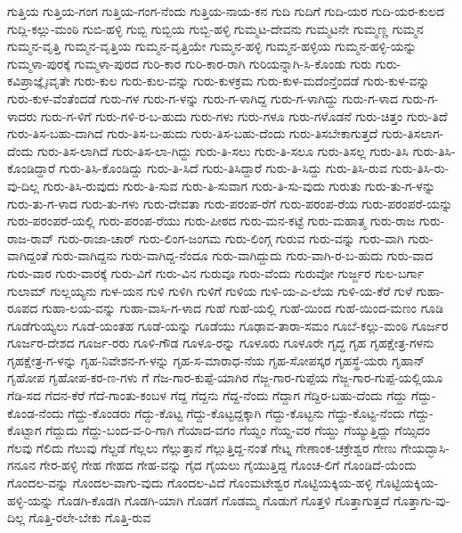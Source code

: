 ಗುತ್ತಿಯ
ಗುತ್ತಿಯ-ಗಂಗ
ಗುತ್ತಿಯ-ಗಂಗ-ನೆಂದು
ಗುತ್ತಿಯ-ನಾಯ-ಕನ
ಗುದಿ
ಗುದಿಗೆ
ಗುದಿ-ಯರ
ಗುದಿ-ಯರ-ಕುಲದ
ಗುದ್ಲಿ-ಕಲ್ಲು-ಮಂಠಿ
ಗುಬಿ-ಹಳ್ಳಿ
ಗುಬ್ಬಿ
ಗುಬ್ಬಿಯ
ಗುಬ್ಬಿ-ಹಳ್ಳಿ
ಗುಮ್ಮಟ-ದೇವನು
ಗುಮ್ಮಟನೇ
ಗುಮ್ಮಣ್ಣ
ಗುಮ್ಮನ
ಗುಮ್ಮನ-ವೃತ್ತಿ
ಗುಮ್ಮನ-ವೃತ್ತಿಯ
ಗುಮ್ಮನ-ವೃತ್ತಿಯೇ
ಗುಮ್ಮನ-ಹಳ್ಳಿ
ಗುಮ್ಮನ-ಹಳ್ಳಿಯ
ಗುಮ್ಮನ-ಹಳ್ಳಿ-ಯನ್ನು
ಗುಮ್ಮಳಾ-ಪುರಕ್ಕೆ
ಗುಮ್ಮಳಾ-ಪುರದ
ಗುರಿ-ಕಾರ
ಗುರಿ-ಕಾರ-ರಾಗಿ
ಗುರಿಯನ್ನಾಗಿ-ಸಿ-ಕೊಂಡು
ಗುರು
ಗುರು-ಕವಿಪ್ರಾಜ್ಞೈಃವೃತೇ
ಗುರು-ಕುಲ
ಗುರು-ಕುಲ-ವನ್ನು
ಗುರು-ಕುಳಕ್ರಮ
ಗುರು-ಕುಳ-ಮದೆಂನ್ತೆಂದಡೆ
ಗುರು-ಕುಳ-ವನ್ನು
ಗುರು-ಕುಳ-ವೆಂತೆಂದಡೆ
ಗುರು-ಗಳ
ಗುರು-ಗ-ಳನ್ನು
ಗುರು-ಗ-ಳಾಗಿದ್ದ
ಗುರು-ಗ-ಳಾಗಿದ್ದು
ಗುರು-ಗ-ಳಾದ
ಗುರು-ಗ-ಳಾದರು
ಗುರು-ಗ-ಳಿಗೆ
ಗುರು-ಗಳಿ-ರ-ಬ-ಹುದು
ಗುರು-ಗಳು
ಗುರು-ಗಳೂ
ಗುರು-ಗಳೊಡನೆ
ಗುರು-ಚಿತ್ತಂ
ಗುರು-ತಿದೆ
ಗುರು-ತಿಸ-ಬಹು-ದಾಗಿದೆ
ಗುರು-ತಿಸ-ಬ-ಹುದು
ಗುರು-ತಿಸ-ಬಹು-ದೆಂದು
ಗುರು-ತಿಸಬೇಕಾಗುತ್ತದೆ
ಗುರು-ತಿಸಲಾಗ-ದೆಂದು
ಗುರು-ತಿಸ-ಲಾಗಿದೆ
ಗುರು-ತಿಸ-ಲಾ-ಗಿದ್ದು
ಗುರು-ತಿ-ಸಲು
ಗುರು-ತಿ-ಸಲೂ
ಗುರು-ತಿಸಲ್ಲ
ಗುರು-ತಿಸಿ
ಗುರು-ತಿಸಿ-ಕೊಂಡಿದ್ದಾರೆ
ಗುರು-ತಿಸಿ-ಕೊಂಡಿದ್ದು
ಗುರು-ತಿ-ಸಿದೆ
ಗುರು-ತಿಸಿದ್ದಾರೆ
ಗುರು-ತಿ-ಸಿದ್ದು
ಗುರು-ತಿಸಿ-ರುವ
ಗುರು-ತಿಸಿ-ರು-ವು-ದಿಲ್ಲ
ಗುರು-ತಿಸಿ-ರುವುದು
ಗುರು-ತಿ-ಸುವ
ಗುರು-ತಿ-ಸುವಾಗ
ಗುರು-ತಿ-ಸು-ವುದು
ಗುರುತು
ಗುರು-ತು-ಗ-ಳನ್ನು
ಗುರು-ತು-ಗ-ಳಾದ
ಗುರು-ತು-ಗಳು
ಗುರು-ದೇವತಾ
ಗುರು-ಪರಂಪ-ರೆಗೆ
ಗುರು-ಪರಂಪ-ರೆಯ
ಗುರು-ಪರಂಪರೆ-ಯನ್ನು
ಗುರು-ಪರಂಪರೆ-ಯಲ್ಲಿ
ಗುರು-ಪರಂಪ-ರೆಯು
ಗುರು-ಪೀಠದ
ಗುರು-ಮನ-ಕಟ್ಟೆ
ಗುರು-ಮಹಾತ್ಮ
ಗುರು-ರಾಜ
ಗುರು-ರಾಜ-ರಾವ್
ಗುರು-ರಾಜಾ-ಚಾರ್
ಗುರು-ಲಿಂಗ-ಜಂಗಮ
ಗುರು-ಲಿಂಗ್ಗ
ಗುರುವ
ಗುರು-ವನ್ನು
ಗುರು-ವಾಗಿ
ಗುರು-ವಾಗಿದ್ದಂತೆ
ಗುರು-ವಾಗಿದ್ದನು
ಗುರು-ವಾಗಿದ್ದ-ನೆಂದೂ
ಗುರು-ವಾಗಿದ್ದುದು
ಗುರು-ವಾಗಿ-ರ-ಬ-ಹುದು
ಗುರು-ವಾದ
ಗುರು-ವಾರ
ಗುರು-ವಾರಕ್ಕೆ
ಗುರು-ವಿಗೆ
ಗುರು-ವಿನ
ಗುರುವೂ
ಗುರು-ವೆಂದು
ಗುರುವೋ
ಗುರ್ಜ್ಜರ
ಗುಲ-ಬರ್ಗಾ
ಗುಲಾಮ್
ಗುಲ್ಲಯ್ಯನು
ಗುಳ-ಯನ
ಗುಳಿ
ಗುಳಿಗಿ
ಗುಳಿಗೆ
ಗುಳಿಯ
ಗುಳಿ-ಯ-ಎ-ಲೆಯ
ಗುಳಿ-ಯ-ಕೆರೆ
ಗುಳೆ
ಗುಹಾ-ರೂಪದ
ಗುಹಾ-ಲಯ-ವನ್ನು
ಗುಹಾ-ವಾಸಿ-ಗ-ಳಾದ
ಗುಹೆ
ಗುಹೆ-ಯಲ್ಲಿ
ಗುಹೆ-ಯಿಂದ
ಗುಹೆ-ಯಿಂದ-ಮಣಂ
ಗೂಡಿ
ಗೂಡೆಗುಯ್ಯಲು
ಗೂಡೆ-ಯಂತಹ
ಗೂಡೆ-ಯನ್ನು
ಗೂಡೆಯು
ಗೂಢಾವ-ತಾರಾ-ಸಮಂ
ಗೂಬೆ-ಕಲ್ಲು-ಮಂಠಿ
ಗೂರ್ಜರ
ಗೂರ್ಜರ-ದೇಶದ
ಗೂರ್ಜ-ರರು
ಗೂಳಿ-ಗೌಡ
ಗೂಳೂ-ರನ್ನು
ಗೂಳೂರು
ಗೂಳೂರೇ
ಗೃದ್ಧ
ಗೃಹ
ಗೃಹಕ್ಷೇತ್ರ-ಗಳನು
ಗೃಹಕ್ಷೇತ್ರ-ಗ-ಳನ್ನು
ಗೃಹ-ನಿವೇಶನ-ಗ-ಳನ್ನು
ಗೃಹ-ಸ-ಮಾರಾಧ-ನೆಯ
ಗೃಹ-ಸೋಪಸ್ಕರ
ಗೃಹಸ್ಥೆ-ಯರು
ಗೃಹಾನ್
ಗೃಹೋಪ
ಗೃಹೋಪ-ಕರ-ಣ-ಗಳು
ಗೆ
ಗೆಜ-ಗಾರ-ಕುಪ್ಪೆ-ಯಾಗಿರ
ಗೆಜ್ಜ-ಗಾರ-ಗುಪ್ಪೆಯ
ಗೆಜ್ಜ-ಗಾರ-ಗುಪ್ಪೆ-ಯಲ್ಲಿಯೂ
ಗೆಡಿ-ಸದ
ಗೆದನ-ಕೆರೆ
ಗೆದೆ-ಗಾಂತು-ಕಂಬಳ
ಗೆದ್ದ
ಗೆದ್ದನು
ಗೆದ್ದ-ನೆಂದು
ಗೆದ್ದಾಗ
ಗೆದ್ದಿರ-ಬಹು-ದೆಂದು
ಗೆದ್ದು
ಗೆದ್ದು-ಕೊಂಡ-ನೆಂದು
ಗೆದ್ದು-ಕೊಂಡರು
ಗೆದ್ದು-ಕೊಟ್ಟ
ಗೆದ್ದು-ಕೊಟ್ಟದ್ದಕ್ಕಾಗಿ
ಗೆದ್ದು-ಕೊಟ್ಟನು
ಗೆದ್ದು-ಕೊಟ್ಟ-ನೆಂದು
ಗೆದ್ದು-ಕೊಟ್ಟಾಗ
ಗೆದ್ದುದು
ಗೆದ್ದು-ಬಂದ-ವ-ರಿ-ಗಾಗಿ
ಗೆಯಾದ-ವಗಂ
ಗೆಯ್ದಂ
ಗೆಯ್ದ-ವರ
ಗೆಯ್ದು
ಗೆಯ್ಯುತ್ತಿದ್ದು
ಗೆಯ್ಸಿದಂ
ಗೆಲವು
ಗೆಲಿದು
ಗೆಲುವು
ಗೆಲ್ದಡೆ
ಗೆಲ್ಲಲು
ಗೆಲ್ಲುತ್ತಾನೆ
ಗೆಲ್ಲುತ್ತಿದ್ದ-ನಂತೆ
ಗೇಟ್ನ
ಗೇಣಾಂಕ-ಚಕ್ರೇಶ್ವರ
ಗೇಣು
ಗೇಯದ್ಭಾಸಿ-ಗನೂನ
ಗೇರ-ಹಳ್ಳಿ
ಗೇಹ
ಗೇಹದ
ಗೇಹ-ವನ್ನು
ಗೈದ
ಗೈಯಲು
ಗೈಯುತ್ತಿದ್ದ
ಗೊಂಚ-ಲಿಗೆ
ಗೊಂಡಿದೆ-ಯೆಂದು
ಗೊಂದಲ-ವನ್ನು
ಗೊಂದಲ-ವಾಗು-ವುದು
ಗೊಂದಲ-ವಿದೆ
ಗೊಂಮಟೇಶ್ವರ
ಗೊಟ್ಟಿಯಕ್ಕಿಯ-ಹಳ್ಳಿ
ಗೊಟ್ಟಿಯಕ್ಕಿಯ-ಹಳ್ಳಿ-ಯನ್ನು
ಗೊಡಗಿ-ಕೊಡಗಿ
ಗೊಡಗಿ-ಯಾಗಿ
ಗೊಡಗೆ
ಗೊಡಮ್ಮ
ಗೊಡುಗೆ
ಗೊತ್ತಳಿ
ಗೊತ್ತಾಗುತ್ತದೆ
ಗೊತ್ತಾಗು-ವು-ದಿಲ್ಲ
ಗೊತ್ತಿ-ರಲೇ-ಬೇಕು
ಗೊತ್ತಿ-ರುವ

